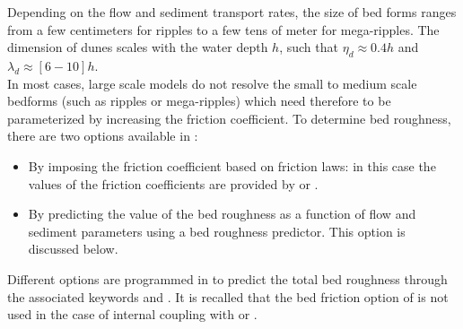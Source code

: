 Depending on the flow and sediment transport rates, the size of bed
forms ranges from a few centimeters for ripples to a few tens of meter for
mega-ripples. The dimension of dunes scales with the water depth $h$, such that $\eta_d
\approx 0.4 h$ and  $\lambda_d\approx [6-10] h$.\\

In most cases, large scale models do not resolve the small to medium
scale bedforms (such as ripples or mega-ripples) which need therefore to be parameterized by increasing the friction coefficient. To determine bed roughness, there are two options available in \sisyphe{}:
\begin{itemize}
\item By imposing the friction coefficient based on friction laws: in this case the values of the friction coefficients are provided by  or .
\item By predicting the value of the bed roughness as a function of flow and sediment parameters using a bed roughness predictor. This option is discussed below.
\end{itemize}
Different options are programmed in \sisyphe to predict the total bed
roughness through the associated keywords  and . It is recalled that the bed friction option of \sisyphe is not
used in the case of internal coupling with  or .
